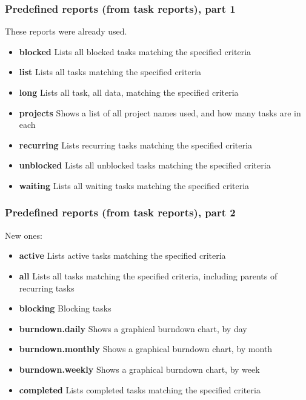 \documentclass[t,handout,aspectratio=169]{beamer}
\begin{document}
\begin{frame}[fragile]\frametitle{Predefined reports (from task reports), part 1}
    \vfill
    These reports were already used.

    \begin{itemize}
        \item \textbf{blocked}          Lists all blocked tasks matching the specified criteria
        \item \textbf{list}             Lists all tasks matching the specified criteria
        \item \textbf{long}             Lists all task, all data, matching the specified criteria
        \item \textbf{projects}         Shows a list of all project names used, and how many tasks are in each
        \item \textbf{recurring}        Lists recurring tasks matching the specified criteria
        \item \textbf{unblocked}        Lists all unblocked tasks matching the specified criteria
        \item \textbf{waiting}          Lists all waiting tasks matching the specified criteria
    \end{itemize}
\end{frame}

\begin{frame}[fragile]\frametitle{Predefined reports (from task reports), part 2}
    \vfill
    New ones:

    \begin{itemize}
        \item \textbf{active}           Lists active tasks matching the specified criteria
        \item \textbf{all}              Lists all tasks matching the specified criteria, including parents of recurring tasks
        \item \textbf{blocking}         Blocking tasks
        \item \textbf{burndown.daily}   Shows a graphical burndown chart, by day
        \item \textbf{burndown.monthly} Shows a graphical burndown chart, by month
        \item \textbf{burndown.weekly}  Shows a graphical burndown chart, by week
        \item \textbf{completed}        Lists completed tasks matching the specified criteria
    \end{itemize}
\end{frame}
\end{document}
